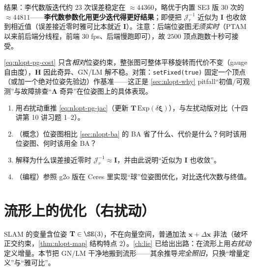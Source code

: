 \noindent 结果：李代数版迭代约 $23$ 次误差稳定在 $\approx44360$，略优于内置 SE3 版 $30$ 次的 $\approx44811$——\textbf{李代数参数化用更少迭代得更好结果}；即便把 $\mathcal{J}_r^{-1}$ 近似为 $\mathbf{I}$ 也收敛到相近值（误差接近零时雅可比本就近 $\mathbf{I}$）。注意：后端位姿图\emph{无须实时}（PTAM 以来前后端分线程，前端 $30$ fps、后端慢跑即可），故 $2500$ 顶点跑数十秒可接受。

\begin{pitfall}
\cref{eq:nlopt-pg-cost} 只含\emph{相对}位姿约束，整张图可整体平移旋转而代价不变（gauge 自由度），$\mathbf{H}$ 因此奇异、GN/LM 解不稳。对策：\texttt{setFixed(true)} 固定一个顶点（或加一个绝对位姿先验边）作基准——这正是 \cref{sec:nlopt-why} pitfall“初值/可观测”与故障排查“$\boldsymbol{\Lambda}$ 奇异”在位姿图上的具体表现。
\end{pitfall}

\begin{practice}
\begin{enumerate}
  \item 用\emph{右}扰动重推 \cref{eq:nlopt-pg-jac}（更新 $\mathbf{T}\,\mathrm{Exp}(\delta\boldsymbol{\xi})$），与左扰动版对比（十四讲第 10 讲习题 1--2）。
  \item （概念）位姿图相比 \cref{sec:nlopt-ba} 的 BA 省了什么、代价是什么？何时该用位姿图、何时该用全 BA？
  \item 解释为什么误差接近零时 $\mathcal{J}_r^{-1}\approx\mathbf{I}$，并由此说明“近似为 $\mathbf{I}$ 也收敛”。
  \item （编程）参照 g2o 版在 Ceres 里实现“球”位姿图优化，对比迭代次数与终值。
\end{enumerate}
\end{practice}

\section{流形上的优化（右扰动）}
\label{sec:nlopt-manifold}

SLAM 的变量含位姿 $\mathbf{T}\in\SE(3)$，不在向量空间，普通加法 $\mathbf{x}+\Delta\mathbf{x}$ 非法（破坏正交约束，\cref{thm:nlopt-map} 结构特点 2）。\cref{ch:lie} 已给出出路：在流形上用\emph{右扰动}定义增量。本节把 GN/LM 干净地搬到流形——其余推导\emph{完全照旧}，只换“增量定义”与“雅可比”。

